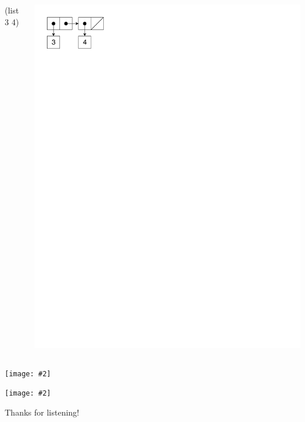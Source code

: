 \documentclass[UKenglish,usenames,dvipsnames,svgnames,table,aspectratio=169,mathserif]{beamer}
\newcommand{\imageslide}[2][1]{{
\begin{frame}\begin{center}
\texttt{[image: \#2]}
\end{center}\end{frame}
}}
\begin{document}
\begin{frame}[fragile]
\begin{columns}[T]
\begin{schemecode}
  (list 3 4)
\end{schemecode}
\includegraphics{list-cons2.pdf}
\end{columns}
\end{frame}


\imageslide[1.3]{pushout1.pdf}
\imageslide[1.3]{pushout2.pdf}


\begin{frame}
\huge \centering
Thanks for listening!
\end{frame}


\end{document}
